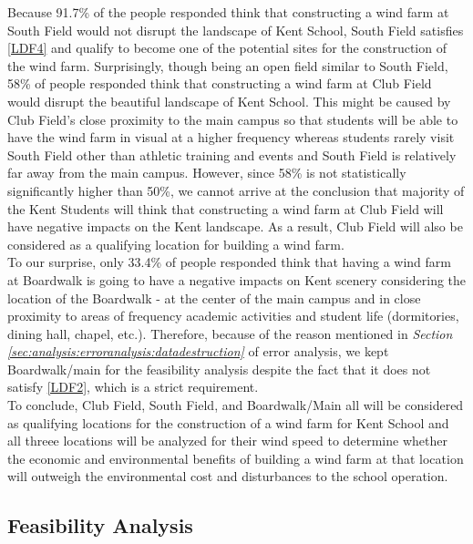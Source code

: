 \documentclass[review]{elsarticle}
\begin{document}
Because 91.7\% of the people responded think that constructing a wind farm at South Field would not disrupt the landscape of Kent School, 
South Field satisfies \ref{LDF4} and qualify to become one of the potential sites for the construction of the wind 
farm. Surprisingly, though being an open field similar to South Field, 58\% of people responded think that constructing a wind farm at Club 
Field would disrupt the beautiful landscape of Kent School. This might be caused by Club Field's close proximity to the main campus so that 
students will be able to have the wind farm in visual at a higher frequency whereas students rarely visit South Field other than athletic 
training and events and South Field is relatively far away from the main campus. However, since 58\% is not statistically significantly 
higher than 50\%, we cannot arrive at the conclusion that majority of the Kent Students will think that constructing a wind farm at Club 
Field will have negative impacts on the Kent landscape. As a result, Club Field will also be considered as a qualifying location for building 
a wind farm.
\\\indent To our surprise, only 33.4\% of people responded think that having a wind farm at Boardwalk is going to have a negative impacts on 
Kent scenery considering the location of the Boardwalk - at the center of the main campus and in close proximity to areas of frequency 
academic activities and student life (dormitories, dining hall, chapel, etc.). Therefore, because of the reason mentioned in \textit{Section \ref{sec:analysis:erroranalysis:datadestruction}} 
of error analysis, we kept Boardwalk/main for the feasibility analysis despite the fact that it does not satisfy \ref{LDF2}, which is a strict requirement.
\\\indent To conclude, Club Field, South Field, and Boardwalk/Main all will be considered as qualifying locations for the construction of 
a wind farm for Kent School and all threee locations will be analyzed for their wind speed to determine whether the economic and environmental 
benefits of building a wind farm at that location will outweigh the environmental cost and disturbances to the school operation.


\subsection{Feasibility Analysis}
\end{document}
